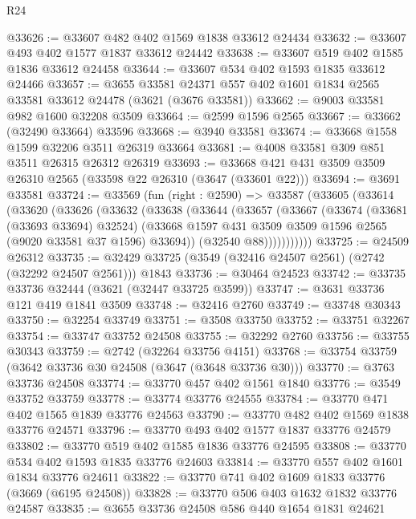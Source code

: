 \begin{lexlean}{R24}
\begin{coremodule}
@33626 := @33607 @482 @402 @1569 @1838 @33612 @24434
@33632 := @33607 @493 @402 @1577 @1837 @33612 @24442
@33638 := @33607 @519 @402 @1585 @1836 @33612 @24458
@33644 := @33607 @534 @402 @1593 @1835 @33612 @24466
@33657 := @3655
    @33581
    @24371
    @557
    @402
    @1601
    @1834
    @2565
    @33581
    @33612
    @24478
    (@3621 (@3676 @33581))
@33662 := @9003 @33581 @982 @1600 @32208 @3509
@33664 := @2599 @1596 @2565
@33667 := @33662 (@32490 @33664) @33596
@33668 := @3940 @33581
@33674 := @33668 @1558 @1599 @32206 @3511 @26319 @33664
@33681 := @4008 @33581 @309 @851 @3511 @26315 @26312 @26319
@33693 := @33668 @421 @431 @3509 @3509 @26310 @2565 (@33598 @22 @26310 (@3647 (@33601 @22)))
@33694 := @3691 @33581
@33724 := @33569
    (fun (right : @2590) =>
    @33587
      (@33605
        (@33614
          (@33620
            (@33626
              (@33632
                (@33638
                  (@33644
                    (@33657
                      (@33667
                        (@33674
                          (@33681 (@33693 @33694) @32524)
                          (@33668
                            @1597
                            @431
                            @3509
                            @3509
                            @1596
                            @2565
                            (@9020 @33581 @37 @1596)
                            @33694))
                        (@32540 @88)))))))))))
@33725 := @24509 @26312
@33735 := @32429 @33725 (@3549 (@32416 @24507 @2561) (@2742 (@32292 @24507 @2561))) @1843
@33736 := @30464 @24523
@33742 := @33735 @33736 @32444 (@3621 (@32447 @33725 @3599))
@33747 := @3631 @33736 @121 @419 @1841 @3509
@33748 := @32416 @2760
@33749 := @33748 @30343
@33750 := @32254 @33749
@33751 := @3508 @33750
@33752 := @33751 @32267
@33754 := @33747 @33752 @24508
@33755 := @32292 @2760
@33756 := @33755 @30343
@33759 := @2742 (@32264 @33756 @4151)
@33768 := @33754 @33759 (@3642 @33736 @30 @24508 (@3647 (@3648 @33736 @30)))
@33770 := @3763 @33736 @24508
@33774 := @33770 @457 @402 @1561 @1840
@33776 := @3549 @33752 @33759
@33778 := @33774 @33776 @24555
@33784 := @33770 @471 @402 @1565 @1839 @33776 @24563
@33790 := @33770 @482 @402 @1569 @1838 @33776 @24571
@33796 := @33770 @493 @402 @1577 @1837 @33776 @24579
@33802 := @33770 @519 @402 @1585 @1836 @33776 @24595
@33808 := @33770 @534 @402 @1593 @1835 @33776 @24603
@33814 := @33770 @557 @402 @1601 @1834 @33776 @24611
@33822 := @33770 @741 @402 @1609 @1833 @33776 (@3669 (@6195 @24508))
@33828 := @33770 @506 @403 @1632 @1832 @33776 @24587
@33835 := @3655 @33736 @24508 @586 @440 @1654 @1831 @24621

\end{coremodule}
\end{lexlean}
